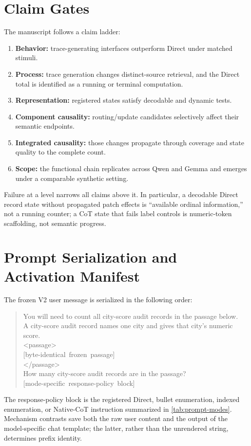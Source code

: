 \documentclass[10pt,twocolumn]{article}
\begin{document}
\clearpage
\appendix

\section{Claim Gates}
The manuscript follows a claim ladder:
\begin{enumerate}
  \item \textbf{Behavior:} trace-generating interfaces outperform Direct under matched stimuli.
  \item \textbf{Process:} trace generation changes distinct-source retrieval, and the Direct
  total is identified as a running or terminal computation.
  \item \textbf{Representation:} registered states satisfy decodable and dynamic tests.
  \item \textbf{Component causality:} routing/update candidates selectively affect their
  semantic endpoints.
  \item \textbf{Integrated causality:} those changes propagate through coverage and state quality
  to the complete count.
  \item \textbf{Scope:} the functional chain replicates across Qwen and Gemma and emerges under
  a comparable synthetic setting.
\end{enumerate}
Failure at a level narrows all claims above it. In particular, a decodable Direct record state
without propagated patch effects is ``available ordinal information,'' not a running counter;
a CoT state that fails label controls is numeric-token scaffolding, not semantic progress.

\section{Prompt Serialization and Activation Manifest}
The frozen V2 user message is serialized in the following order:
\begin{quote}\small\ttfamily
You will need to count all city-score audit records in the passage below.\\
A city-score audit record names one city and gives that city's numeric score.\\[2pt]
<passage>\\
\mbox{[byte-identical frozen passage]}\\
</passage>\\[2pt]
How many city-score audit records are in the passage?\\
\mbox{[mode-specific response-policy block]}
\end{quote}
The response-policy block is the registered Direct, bullet enumeration, indexed enumeration, or
Native-CoT instruction summarized in \cref{tab:prompt-modes}. Mechanism contrasts save both the
raw user content and the output of the model-specific chat template; the latter, rather than the
unrendered string, determines prefix identity.
\end{document}
